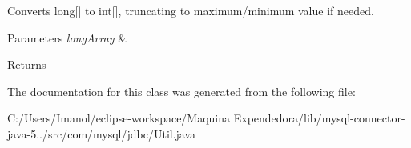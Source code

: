 Converts long\mbox{[}\mbox{]} to int\mbox{[}\mbox{]}, truncating to maximum/minimum value if needed.


\begin{DoxyParams}{Parameters}
{\em long\+Array} & \\
\hline
\end{DoxyParams}
\begin{DoxyReturn}{Returns}

\end{DoxyReturn}


The documentation for this class was generated from the following file\+:\begin{DoxyCompactItemize}
\item 
C\+:/\+Users/\+Imanol/eclipse-\/workspace/\+Maquina Expendedora/lib/mysql-\/connector-\/java-\/5../src/com/mysql/jdbc/Util.\+java\end{DoxyCompactItemize}
